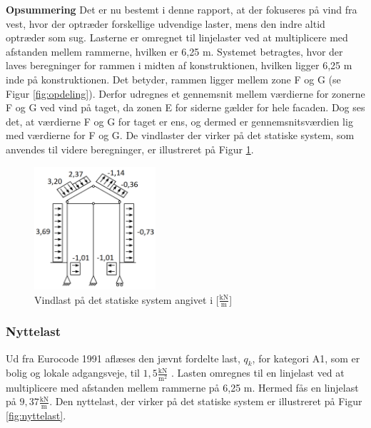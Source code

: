 \textbf{Opsummering}
\newline
Det er nu bestemt i denne rapport, at der fokuseres på vind fra vest, hvor der optræder forskellige udvendige laster, mens den indre altid optræder som sug. Lasterne er omregnet til linjelaster ved at multiplicere med afstanden mellem rammerne, hvilken er 6,25 m. 
\newline
\newline
Systemet betragtes, hvor der laves beregninger for rammen i midten af konstruktionen, hvilken ligger 6,25 m inde på konstruktionen. Det betyder, rammen ligger mellem zone F og G (se Figur \ref{fig:opdeling}). Derfor udregnes et gennemsnit mellem værdierne for zonerne F og G ved vind på taget, da zonen E for siderne gælder for hele facaden. 
Dog ses det, at værdierne F og G for taget er ens, og dermed er gennemsnitsværdien lig med værdierne for F og G. 
\newline \indent{     }  De vindlaster der virker på det statiske system, som anvendes til videre beregninger, er illustreret på Figur \ref{fig:vindlast}. 

\begin{figure}[H]
	\centering
	\includegraphics[width=0.4\textwidth]{billeder/vindlast.png}
	\caption{Vindlast på det statiske system angivet i [$\frac{\text{kN}}{\text{m}}$]}
	\label{fig:vindlast}
\end{figure}

\subsubsection{Nyttelast}
Ud fra Eurocode 1991 aflæses den jævnt fordelte last, $q_k$, for kategori A1, som er bolig og lokale adgangsveje, til $1,\!5 \frac{\text{kN}}{\text{m}^2}$ \citep[ tabel 6.2 kapitel 6.3.1.2]{EU91}. Lasten omregnes til en linjelast ved at multiplicere med afstanden mellem rammerne på 6,25 m. Hermed fås en linjelast på $9,\!37 \frac{\text{kN}}{\text{m}}$. 
\newline \indent{     }  Den nyttelast, der virker på det statiske system er illustreret på Figur \ref{fig:nyttelast}.

